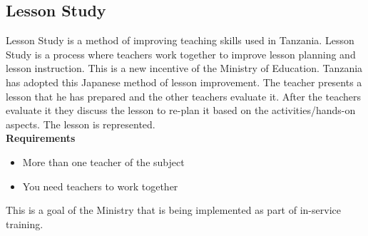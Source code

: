 \subsection{Lesson Study}
Lesson Study is a method of improving teaching skills used in Tanzania. Lesson Study is a process where teachers work together to improve lesson planning and lesson instruction. 
This is a new incentive of the Ministry of Education. 
Tanzania has adopted this Japanese method of lesson improvement. The teacher presents a lesson that he has prepared and the other teachers evaluate it. After the teachers evaluate it they discuss the lesson to re-plan it based on the activities/hands-on aspects. The lesson is represented.\\
\textbf{Requirements}
\begin{itemize}
\item{More than one teacher of the subject}
\item{You need teachers to work together}
\end{itemize}
This is a goal of the Ministry that is being implemented as part of in-service training.

